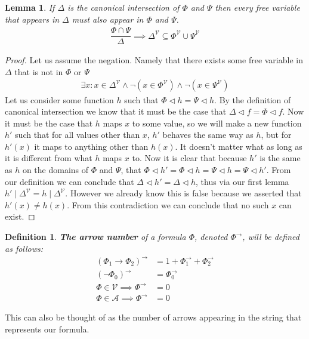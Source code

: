 \documentclass{article}
\newtheorem{lem}{Lemma}
\newtheorem{defin}{Definition}
\begin{document}
\begin{lem}
If $\Delta$ is the canonical intersection of $\Phi$ and $\Psi$ then every free variable that appears in $\Delta$ must also appear in $\Phi$ and $\Psi$.
\begin{align*}
\dfrac{\Phi\cap\Psi}{\Delta}\implies\Delta^\mathcal{V}\subseteq\Phi^\mathcal{V}\cup\Psi^\mathcal{V}
\end{align*}
\end{lem}
\begin{proof}
Let us assume the negation.
Namely that there exists some free variable in $\Delta$ that is not in $\Phi$ or $\Psi$
\begin{align*}
\exists x : x \in \Delta^\mathcal{V} \land \neg (x \in \Phi^\mathcal{V}) \land \neg (x \in \Psi^\mathcal{V})
\end{align*}
Let us consider some function $h$ such that $\Phi\lhd h=\Psi\lhd h$.
By the definition of canonical intersection we know that it must be the case that $\Delta\lhd f = \Phi\lhd f$.
Now it must be the case that $h$ maps $x$ to some value, so we will make a new function $h'$ such that
for all values other than $x$, $h'$ behaves the same way as $h$, but for $h'(x)$ it maps to anything other than $h(x)$.
It doesn't matter what as long as it is different from what $h$ maps $x$ to.
Now it is clear that because $h'$ is the same as $h$ on the domains of $\Phi$ and $\Psi$, that $\Phi\lhd h' = \Phi\lhd h = \Psi\lhd h = \Psi\lhd h'$.
From our definition we can conclude that $\Delta \lhd h' = \Delta \lhd h$, thus via our first lemma $h' \mid \Delta^\mathcal{V} = h \mid \Delta^\mathcal{V}$.
However we already know this is false because we asserted that $h'(x) \neq h(x)$.
From this contradiction we can conclude that no such $x$ can exist.
\end{proof}
\begin{defin}
\textbf{The arrow number} of a formula $\Phi$, denoted $\Phi^\rightarrow$, will be defined as follows:
\begin{align*}
(\Phi_1\rightarrow\Phi_2)^\rightarrow &= 1 + \Phi_1^\rightarrow + \Phi_2^\rightarrow \\
(\neg\Phi_0)^\rightarrow &= \Phi_0^\rightarrow \\
\Phi \in \mathcal{V} \implies \Phi^\rightarrow &= 0\\
\Phi \in \mathcal{A} \implies \Phi^\rightarrow &= 0
\end{align*}
\end{defin}
This can also be thought of as the number of arrows appearing in the string that represents our formula.
\end{document}
